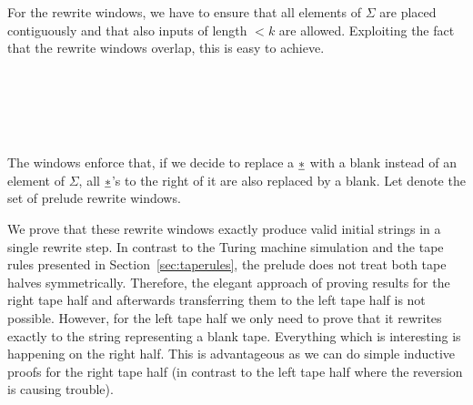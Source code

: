 For the rewrite windows, we have to ensure that all elements of $\Sigma$ are placed contiguously and that also inputs of length $< k$ are allowed. Exploiting the fact that the rewrite windows overlap, this is easy to achieve.
\begin{center}
  \trewwin{\nblank}{\nblank}{\nblank}{\polneut\blank}{\polneut\blank}{\polneut\blank}
  \quad \trewwin{\ndelim}{\nblank}{\nblank}{\#}{\polneut\blank}{\polneut\blank}
  \quad \trewwin{\nblank}{\nblank}{\ndelim}{\polneut\blank}{\polneut\blank}{\#} \\
  \quad {} 
  \quad {} \\
  \quad {} 
  \quad {} 
  \quad {} \\
  \quad {} 
  \quad \trewwin{\nstar}{\nstar}{\nstar}{\polneut\blank}{\polneut\blank}{\polneut\blank}\\
  \quad \trewwin{\nstar}{\nstar}{\nblank}{\polneut{\blank}}{\polneut{\blank}}{\polneut{\blank}}
  \quad {}
\end{center}
The windows enforce that, if we decide to replace a $\underline{*}$ with a blank instead of an element of $\Sigma$, all $\underline{*}$'s to the right of it are also replaced by a blank.
Let \mnotec{$\Rprelude$} denote the set of prelude rewrite windows.

We prove that these rewrite windows exactly produce valid initial strings in a single rewrite step.
In contrast to the Turing machine simulation and the tape rules presented in Section~\ref{sec:taperules}, the prelude does not treat both tape halves symmetrically. 
Therefore, the elegant approach of proving results for the right tape half and afterwards transferring them to the left tape half is not possible. However, for the left tape half we only need to prove that it rewrites exactly to the string representing a blank tape. Everything which is interesting is happening on the right half. 
This is advantageous as we can do simple inductive proofs for the right tape half (in contrast to the left tape half where the reversion is causing trouble).


